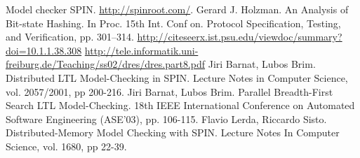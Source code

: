 \begin{thebibliography}{99}
 Model checker SPIN. \url{http://spinroot.com/}.
 Gerard J. Holzman. An Analysis of Bit-state
  Hashing. In Proc. 15th Int. Conf on. Protocol Specification,
  Testing, and Verification, pp. 301–314.
  \url{http://citeseerx.ist.psu.edu/viewdoc/summary?doi=10.1.1.38.308}
  \url{http://tele.informatik.uni-freiburg.de/Teaching/ss02/dres/dres.part8.pdf}
 Jiri Barnat, Lubos Brim. Distributed LTL
  Model-Checking in SPIN. Lecture Notes in Computer Science,
  vol. 2057/2001, pp 200-216.
 Jiri Barnat, Lubos Brim. Parallel Breadth-First Search
  LTL Model-Checking. 18th IEEE International Conference on Automated
  Software Engineering (ASE'03), pp. 106-115.
 Flavio Lerda, Riccardo Sisto. Distributed-Memory Model
  Checking with SPIN. Lecture Notes In Computer Science, vol. 1680, pp
  22-39.
\end{thebibliography}

